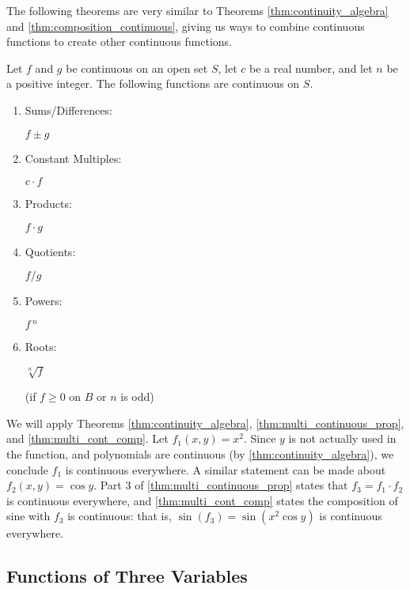 The following theorems are very similar to Theorems \ref{thm:continuity_algebra} and \ref{thm:composition_continuous}, giving us ways to combine continuous functions to create other continuous functions.

{Let $f$ and $g$ be continuous on an open set $S$, let $c$ be a real number, and let $n$ be a positive integer. The following functions are continuous on $S$.%
%
\begin{enumerate}
	\item		\parbox{80pt}{Sums/Differences:}	$f\pm g$
	\item		\parbox{80pt}{Constant Multiples:}	$c\cdot f$
	\item		\parbox{80pt}{Products:}	$f\cdot g$
	\item		\parbox{80pt}{Quotients:}	$f/g$ 
	\item		\parbox{80pt}{Powers:}	$f\,^n$
	\item		\parbox{80pt}{Roots:}	$\sqrt[n]{f}$ \qquad \parbox[t]{150pt}{\small (if $f\geq 0$ on $B$ or $n$ is odd)}
\end{enumerate}}


{We will apply Theorems \ref{thm:continuity_algebra}, \ref{thm:multi_continuous_prop}, and \ref{thm:multi_cont_comp}. Let $f_1(x,y) = x^2$. Since $y$ is not actually used in the function, and polynomials are continuous (by \autoref{thm:continuity_algebra}), we conclude $f_1$ is continuous everywhere. A similar statement can be made about $f_2(x,y) = \cos y$. Part 3 of \autoref{thm:multi_continuous_prop} states that $f_3=f_1\cdot f_2$ is continuous everywhere, and \autoref{thm:multi_cont_comp} states the composition of sine with $f_3$ is continuous: that is, $\sin (f_3) = \sin(x^2\cos y)$ is continuous everywhere.}

\subsection*{Functions of Three Variables}

